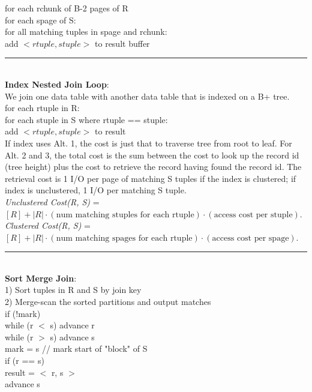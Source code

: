 \documentclass[10pt,landscape]{article}
\newcommand{\ruler}{\\\rule{\columnwidth}{0.25pt}\\}
\begin{document}
\begin{multicols*}{3}
for each rchunk of B-2 pages of R\\
\-\hspace{0.5cm} for each spage of S:\\
\-\hspace{1.0cm} for all matching tuples in spage and rchunk:\\
\-\hspace{1.5cm} add $<rtuple, stuple>$ to result buffer
\ruler
\textbf{Index Nested Join Loop}:\\
We join one data table with another data table that is indexed on a B+ tree.\\
for each rtuple in R:\\
\-\hspace{0.5cm} for each stuple in S where rtuple == stuple:\\
\-\hspace{1.0cm} add $<rtuple, stuple>$ to result\\
If index uses Alt. 1, the  cost is just that to traverse tree from root to leaf. For Alt. 2 and 3, the total cost is the sum between the cost to look up the record id (tree height) plus the cost to retrieve the record having found the record id. The retrieval cost is 1 I/O per page of matching S tuples if the index is clustered; if index is unclustered, 1 I/O per matching S tuple. \\
\textit{Unclustered Cost(R, S)} = $[R] + |R| \cdot (\text{num matching stuples for each rtuple}) \cdot (\text{access cost per stuple})$.
\textit{Clustered Cost(R, S)} = $[R] + |R| \cdot (\text{num matching spages for each rtuple}) \cdot (\text{access cost per spage})$.
\ruler
\textbf{Sort Merge Join}:\\
1) Sort tuples in R and S by join key\\
2) Merge-scan the sorted partitions and output matches\\
if (!mark)\\
\-\hspace{0.5cm} while (r $<$ s) advance r \\
\-\hspace{0.5cm} while (r $>$ s) advance s \\
\-\hspace{0.5cm} mark = s // mark start of "block" of S \\
if (r == s) \\
\-\hspace{0.5cm} result = $<$ r, s $>$\\
\-\hspace{0.5cm} advance s\\

\end{multicols*}
\end{document}
